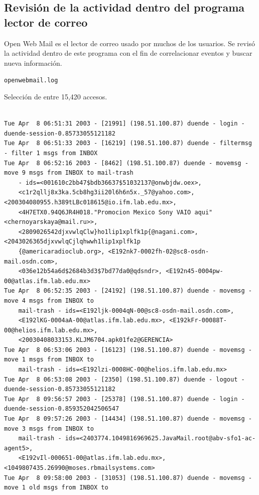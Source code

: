 \subsection{Revisión de la actividad dentro del programa lector de correo}

 Open Web Mail es el lector de correo usado por muchos de los usuarios. Se revisó
la actividad dentro de este programa con el fin de correlacionar eventos y buscar nueva información.

\texttt{openwebmail.log}

Selección de entre 15,420 accesos.
 \vspace{1em}

\begin{lstlisting}[style=terminal]

Tue Apr  8 06:51:31 2003 - [21991] (198.51.100.87) duende - login - duende-session-0.85733055121182
Tue Apr  8 06:51:33 2003 - [16219] (198.51.100.87) duende - filtermsg - filter 1 msgs from INBOX
Tue Apr  8 06:52:16 2003 - [8462] (198.51.100.87) duende - movemsg - move 9 msgs from INBOX to mail-trash 
    - ids=<001610c2bb47$bdb36637$51032137@onwbjdw.oex>, 
    <c1r2qllj8x3ka.5cb8hg3ii20l6h6n5x._57@yahoo.com>, <200304080955.h389tLBc018615@io.ifm.lab.edu.mx>, 
    <4H7ETX0.94Q6JR4H018."Promocion Mexico Sony VAIO aqui"<chernoyarskaya@mail.ru>>, 
    <2809026542djxvwlqClw}ho1lip1xplfk1p{@nagani.com>, <2043026365djxvwlqCjlqhwwh1lip1xplfk1p
    {@americaradioclub.org>, <E192nk7-0002fh-02@sc8-osdn-mail.osdn.com>, 
    <036e12b54a6d$2684b3d3$7bd77da0@qdsndr>, <E192n45-0004pw-00@atlas.ifm.lab.edu.mx>
Tue Apr  8 06:52:35 2003 - [24192] (198.51.100.87) duende - movemsg - move 4 msgs from INBOX to 
    mail-trash - ids=<E192ljk-0004qN-00@sc8-osdn-mail.osdn.com>, 
    <E192lKG-0004aA-00@atlas.ifm.lab.edu.mx>, <E192kFr-00088T-00@helios.ifm.lab.edu.mx>, 
    <20030408033153.KLJM6704.apk01fe2@GERENCIA>
Tue Apr  8 06:53:06 2003 - [16123] (198.51.100.87) duende - movemsg - move 1 msgs from INBOX to 
    mail-trash - ids=<E192lzi-0008HC-00@helios.ifm.lab.edu.mx>
Tue Apr  8 06:53:08 2003 - [2350] (198.51.100.87) duende - logout - duende-session-0.85733055121182
Tue Apr  8 09:56:57 2003 - [25378] (198.51.100.87) duende - login - duende-session-0.859352042506547
Tue Apr  8 09:57:26 2003 - [14434] (198.51.100.87) duende - movemsg - move 3 msgs from INBOX to 
    mail-trash - ids=<2403774.1049816969625.JavaMail.root@abv-sfo1-ac-agent5>, 
    <E192vIl-000651-00@atlas.ifm.lab.edu.mx>, <1049807435.26990@moses.rbmailsystems.com>
Tue Apr  8 09:58:00 2003 - [31053] (198.51.100.87) duende - movemsg - move 1 old msgs from INBOX to 

\end{lstlisting}
